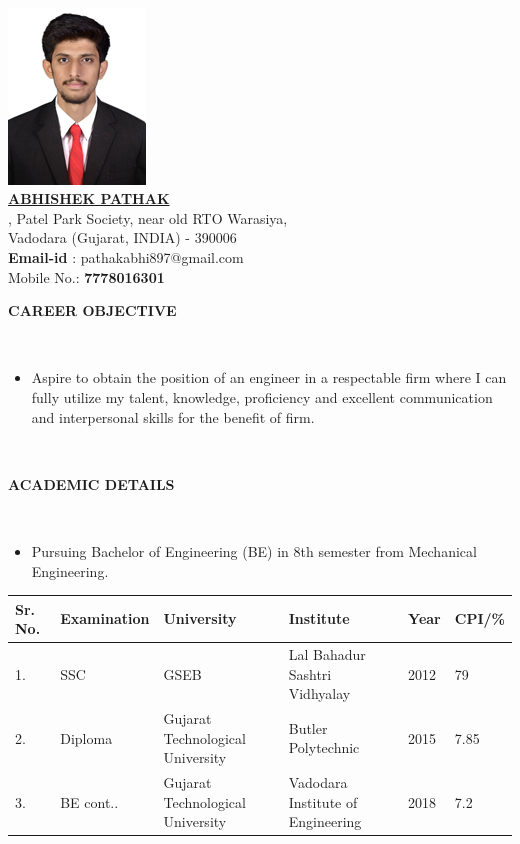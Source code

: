 \documentclass[a4paper,10pt]{article}
\newcommand{\lsep}{-0.5cm}
\newcommand{\resheading}[1]{{\small \colorbox{mygrey}{\begin{minipage}{0.975\textwidth}{\textbf{#1 \vphantom{p\^{E}}}}\end{minipage}}}}
\begin{document}
\hspace{0.5cm}\\[-0.2cm]

\centering
\includegraphics[]{35x45.jpg}\\
\underline{\textbf{ ABHISHEK PATHAK}} \\
, Patel Park Society, 
\indent near old RTO Warasiya,  \\
\indent Vadodara (Gujarat, INDIA) - 390006\\
\indent \textbf{Email-id} : pathakabhi897@gmail.com \\
\indent Mobile No.: \textbf{7778016301} \\

\resheading{\textbf{ CAREER OBJECTIVE} }\\[\lsep]
\begin{itemize}
    \item Aspire to obtain the position of an engineer in a respectable firm where I can fully utilize my talent, knowledge, proficiency and excellent communication and interpersonal skills for the benefit of firm.
\end{itemize}\\

\resheading{\textbf{ACADEMIC DETAILS} }  \\
\hspace{.2 cm}
\begin{itemize}
    \item \noindent Pursuing Bachelor of Engineering (BE) in 8th semester from Mechanical Engineering.
\end{itemize}

\indent \begin{tabular}{ l @{\hskip 0.15in} l @{\hskip 0.15in} l @{\hskip 0.15in} l @{\hskip 0.15in} l @{\hskip 0.15in} l }
\hline
\textbf{Sr. No.} & \textbf{Examination} & \textbf{University} & \textbf{Institute} & \textbf{Year} & \textbf{CPI/\%} \\
\hline
1. & SSC & GSEB & Lal Bahadur Sashtri Vidhyalay & 2012 & 79 \\
2. & Diploma & Gujarat Technological University & Butler Polytechnic & 2015 & 7.85\\
3. & BE cont.. & Gujarat Technological University & Vadodara Institute of Engineering & 2018 & 7.2\\
\hline
\end{tabular}
\\ \\
\end{document}
